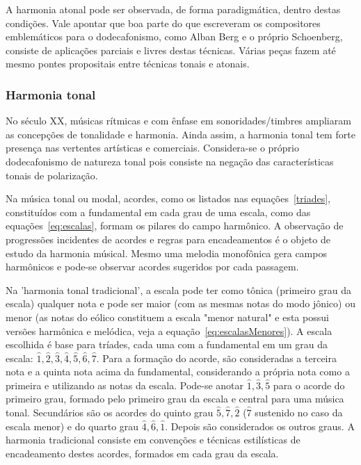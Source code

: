 A harmonia atonal pode ser observada, de forma paradigmática, dentro destas condições.
Vale apontar que boa parte do que escreveram os compositores
emblemáticos para o dodecafonismo, como Alban Berg e o próprio Schoenberg, consiste de
aplicações parciais e livres destas técnicas. Várias peças fazem até mesmo pontes
propositais entre técnicas tonais e atonais.

\subsubsection{Harmonia tonal}
No século XX, músicas rítmicas
e com ênfase em sonoridades/timbres ampliaram 
as concepções de tonalidade e harmonia. Ainda assim, a harmonia tonal tem forte presença
nas vertentes artísticas e comerciais. Considera-se o próprio dodecafonismo de natureza
tonal pois consiste na negação das características tonais de polarização.

Na música tonal ou modal, acordes, como os listados nas equações~\ref{triades}, constituídos com a fundamental em cada
grau de uma escala, como das equações~\ref{eq:escalas}, formam os pilares do campo harmônico.
A observação de progressões incidentes de acordes e regras para encadeamentos é o objeto de estudo da harmonia músical.
Mesmo uma melodia monofônica gera campos harmônicos e pode-se observar acordes sugeridos por cada passagem.



Na 'harmonia tonal tradicional',
a escala pode ter como tônica (primeiro grau da escala) qualquer nota e pode ser maior (com as mesmas notas do modo jônico) ou menor (as notas do eólico constituem a escala "menor natural" e esta possui versões harmônica e melódica, veja a equação~\ref{eq:escalasMenores}). A escala escolhida é
base para tríades, cada uma com a fundamental em um grau 
da escala: $\hat{1},\hat{2},\hat{3},\hat{4},\hat{5},\hat{6},\hat{7}$. Para a formação do acorde, são consideradas a terceira nota e a quinta nota acima da fundamental, considerando a própria nota como a primeira e utilizando as notas da escala.
Pode-se anotar $\hat{1},\hat{3},\hat{5}$ para o acorde do primeiro grau, formado pelo primeiro grau da escala e central para uma música tonal. Secundários são os acordes do quinto grau $\hat{5},\hat{7},\hat{2}$ ($\hat{7}$ sustenido no caso da escala menor) e do quarto grau $\hat{4},\hat{6},\hat{1}$. Depois são considerados os outros graus. A harmonia tradicional consiste em convenções e técnicas estilísticas de encadeamento destes acordes, formados em cada grau da escala.\cite{Harmonia}

